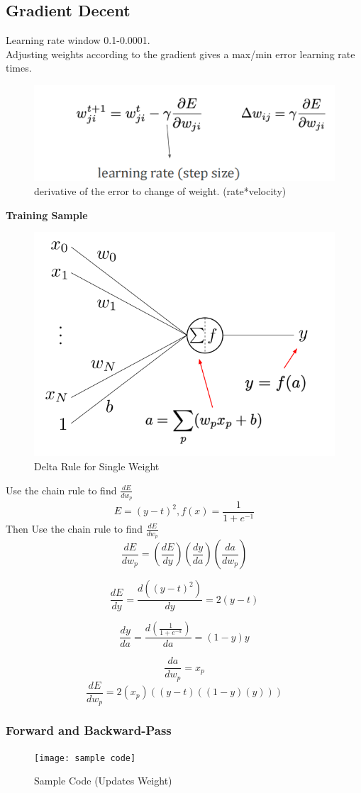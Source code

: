 \documentclass[11pt, english]{article}
\begin{document}
\subsection{Gradient Decent}
Learning rate window 0.1-0.0001.\\
Adjusting weights according to the gradient gives a max/min error learning rate times.
\begin{figure}[H]
    \centering
        \includegraphics[width=0.5\linewidth]{image.png}
    \caption{derivative of the error to change of weight. (rate*velocity)}
    \label{fig:enter-label}
\end{figure}
\textbf{Training Sample}
\begin{figure}[H]
        \centering
        \includegraphics[width=0.5\linewidth]{Screenshot 2025-01-14 at 7.40.24 PM.png}
        \caption{Delta Rule for Single Weight}
        \label{fig:enter-label}
\end{figure}
Use the chain rule to find $\frac{dE}{dw_p}$
\begin{equation}
    E = (y-t)^2, f(x) = \frac{1}{1+e^{-1}}
\end{equation}
Then Use the chain rule to find $\frac{dE}{dw_p}$
\[
\frac{dE}{dw_p} = \left( \frac{dE}{dy} \right) \left( \frac{dy}{da} \right) \left( \frac{da}{dw_p} \right)
\]

\[
\frac{dE}{dy} = \frac{d\left( (y - t)^2 \right)}{dy} = 2(y - t)
\]

\[
\frac{dy}{da} = \frac{d\left( \frac{1}{1 + e^{-a}} \right)}{da} = (1 - y)y
\]

\[
\frac{da}{dw_p} = x_p
\]
\[
\frac{dE}{dw_p} = 2(x_p)((y - t)((1 - y)(y)))
\]

\subsubsection{Forward and Backward-Pass}
\begin{figure}
    \centering
    \texttt{[image: sample code]}
    \caption{Sample Code (Updates Weight)}
    \label{fig:enter-label}
\end{figure}
\end{document}
